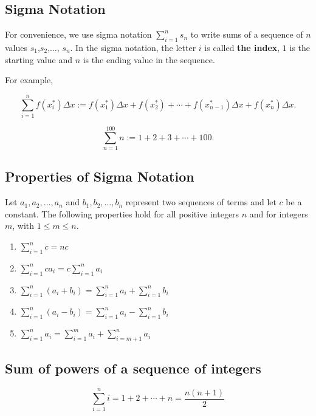 \hypertarget{sigma-notation}{%
\subsection{Sigma Notation}\label{sigma-notation}}

For convenience, we use sigma notation \(\sum\limits_{i=1}^n s_n\) to
write sums of a sequence of \(n\) values \(s_1\),\(s_2\),\(\dots\),
\(s_n\). In the sigma notation, the letter \(i\) is called \textbf{the
index}, \(1\) is the starting value and \(n\) is the ending value in the
sequence.

For example,

\[\sum\limits_{i=1}^nf(x_i^*)\Delta x:=f(x_1^*)\Delta x+f(x_2^*)+\cdots +f(x_{n-1}^*)\Delta x+f(x_n^*)\Delta x.\]

\[\sum\limits_{n=1}^{100}n:=1+2+3+\cdots+100.\]

\hypertarget{properties-of-sigma-notation}{%
\subsection{Properties of Sigma
Notation}\label{properties-of-sigma-notation}}

Let \(a_1,a_2, \dots ,a_n\) and \(b_1,b_2, \dots ,b_n\) represent two sequences of
terms and let \(c\) be a constant. The following properties hold for all
positive integers \(n\) and for integers \(m\), with \(1 \le m \le n.\)

\begin{enumerate}[sepno]
\item
  \(\displaystyle \sum_{i=1}^n c=nc\)
\item
  \(\displaystyle \sum_{i=1}^n ca_i=c\sum_{i=1}^na_i\)
\item
  \(\displaystyle \sum_{i=1}^n(a_i+b_i)=\sum_{i=1}^na_i+\sum_{i=1}^nb_i\)
\item
  \(\displaystyle \sum_{i=1}^n(a_i - b_i)=\sum_{i=1}^na_i - \sum_{i=1}^nb_i\)
\item
  \(\displaystyle \sum_{i=1}^na_i=\sum_{i=1}^ma_i+\sum_{i=m+1}^na_i\)
\end{enumerate}

\hypertarget{sum-of-powers-of-a-sequence-of-integers}{%
\subsection{Sum of powers of a sequence of
integers}\label{sum-of-powers-of-a-sequence-of-integers}}

\[\sum_{i=1}^n i=1+2+ \cdots +n=\dfrac{n(n+1)}{2}\]


